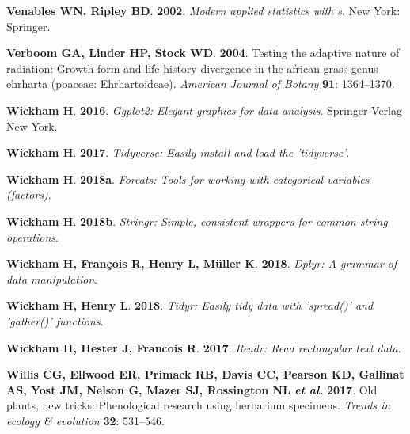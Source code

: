 \documentclass[man,floatsintext]{apa6}
\theoremstyle{definition}
\theoremstyle{definition}
\theoremstyle{definition}
\theoremstyle{remark}
\begin{document}
\leavevmode\hypertarget{ref-R-MASS}{}%
\textbf{\textnormal{Venables WN}, \textnormal{Ripley BD}}.
\textbf{2002}. \emph{Modern applied statistics with s}. New York:
Springer.

\leavevmode\hypertarget{ref-verboom2004testing}{}%
\textbf{\textnormal{Verboom GA}, \textnormal{Linder HP},
\textnormal{Stock WD}}. \textbf{2004}. Testing the adaptive nature of
radiation: Growth form and life history divergence in the african grass
genus ehrharta (poaceae: Ehrhartoideae). \emph{American Journal of
Botany} \textbf{91}: 1364--1370.

\leavevmode\hypertarget{ref-R-ggplot2}{}%
\textbf{\textnormal{Wickham H}}. \textbf{2016}. \emph{Ggplot2: Elegant
graphics for data analysis}. Springer-Verlag New York.

\leavevmode\hypertarget{ref-R-tidyverse}{}%
\textbf{\textnormal{Wickham H}}. \textbf{2017}. \emph{Tidyverse: Easily
install and load the 'tidyverse'}.

\leavevmode\hypertarget{ref-R-forcats}{}%
\textbf{\textnormal{Wickham H}}. \textbf{2018a}. \emph{Forcats: Tools
for working with categorical variables (factors)}.

\leavevmode\hypertarget{ref-R-stringr}{}%
\textbf{\textnormal{Wickham H}}. \textbf{2018b}. \emph{Stringr: Simple,
consistent wrappers for common string operations}.

\leavevmode\hypertarget{ref-R-dplyr}{}%
\textbf{\textnormal{Wickham H}, \textnormal{François R},
\textnormal{Henry L}, \textnormal{Müller K}}. \textbf{2018}.
\emph{Dplyr: A grammar of data manipulation}.

\leavevmode\hypertarget{ref-R-tidyr}{}%
\textbf{\textnormal{Wickham H}, \textnormal{Henry L}}. \textbf{2018}.
\emph{Tidyr: Easily tidy data with 'spread()' and 'gather()' functions}.

\leavevmode\hypertarget{ref-R-readr}{}%
\textbf{\textnormal{Wickham H}, \textnormal{Hester J},
\textnormal{Francois R}}. \textbf{2017}. \emph{Readr: Read rectangular
text data}.

\leavevmode\hypertarget{ref-willis2017old}{}%
\textbf{\textnormal{Willis CG}, \textnormal{Ellwood ER},
\textnormal{Primack RB}, \textnormal{Davis CC}, \textnormal{Pearson KD},
\textnormal{Gallinat AS}, \textnormal{Yost JM}, \textnormal{Nelson G},
\textnormal{Mazer SJ}, \textnormal{Rossington NL} \emph{et al.}}
\textbf{2017}. Old plants, new tricks: Phenological research using
herbarium specimens. \emph{Trends in ecology \& evolution} \textbf{32}:
531--546.
\end{document}
